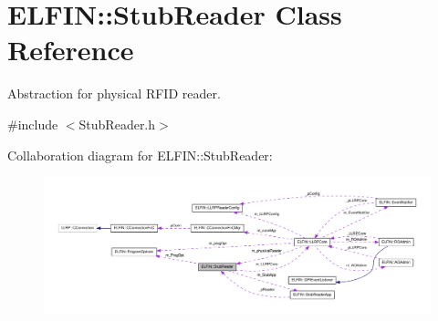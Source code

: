 \hypertarget{class_e_l_f_i_n_1_1_stub_reader}{\section{E\-L\-F\-I\-N\-:\-:Stub\-Reader Class Reference}
\label{class_e_l_f_i_n_1_1_stub_reader}
}


Abstraction for physical R\-F\-I\-D reader.  




{\ttfamily \#include $<$Stub\-Reader.\-h$>$}



Collaboration diagram for E\-L\-F\-I\-N\-:\-:Stub\-Reader\-:
\nopagebreak
\begin{figure}[H]
\begin{center}
\leavevmode
\includegraphics[width=350pt]{class_e_l_f_i_n_1_1_stub_reader__coll__graph}
\end{center}
\end{figure}
